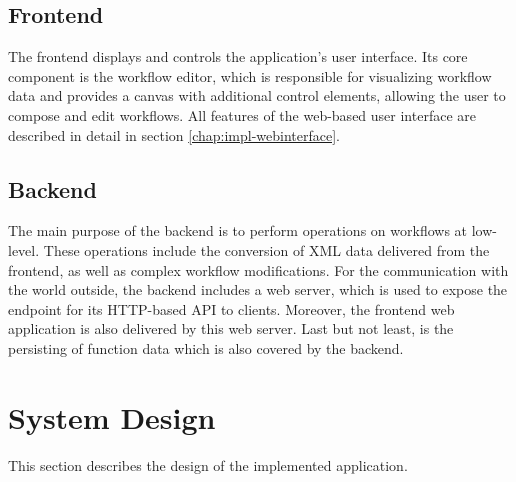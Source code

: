\documentclass[a4paper,12pt,pdftex,halfparskip,cleardoubleempty,bibtotoc,liststotoc]{scrbook}
\begin{document}
\subsection{Frontend}

The frontend displays and controls the application's user interface. Its core component is the workflow editor, which is responsible for visualizing workflow data and provides a canvas with additional control elements, allowing the user to compose and edit workflows. All features of the web-based user interface are described in detail in section  \ref{chap:impl-webinterface}.




\subsection{Backend}

The main purpose of the backend is to perform operations on workflows at low-level. These operations include the conversion of XML data delivered from the frontend, as well as complex workflow modifications.
For the communication with the world outside, the backend includes a web server, which is used to expose the endpoint for its HTTP-based API to clients. Moreover, the frontend web application is also delivered by this web server. 
Last but not least, is the persisting of function data which is also covered by the backend.




\section{System Design}

This  section  describes  the  design  of  the  implemented  application.
\end{document}
